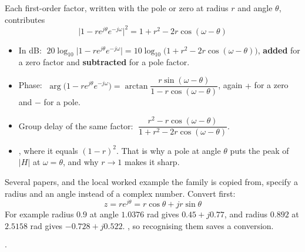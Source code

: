 Each first-order factor, written with the pole or zero at radius $r$ and angle $\theta$,
contributes
\[ \big|1-re^{j\theta}e^{-j\omega}\big|^{2}=1+r^{2}-2r\cos(\omega-\theta) \]
\begin{itemize}
  \item In dB: $\;20\log_{10}\big|1-re^{j\theta}e^{-j\omega}\big|
        =10\log_{10}\!\big(1+r^{2}-2r\cos(\omega-\theta)\big)$,
        \textbf{added} for a zero factor and \textbf{subtracted} for a pole factor.
  \item Phase: $\;\arg\big(1-re^{j\theta}e^{-j\omega}\big)
        =\arctan\dfrac{r\sin(\omega-\theta)}{1-r\cos(\omega-\theta)}$,
        again $+$ for a zero and $-$ for a pole.
  \item Group delay of the same factor:
        $\;\dfrac{r^{2}-r\cos(\omega-\theta)}{1+r^{2}-2r\cos(\omega-\theta)}$.
  \item {}, where it
        equals $(1-r)^2$. That is why a pole at angle $\theta$ puts the peak of $|H|$ at
        $\omega=\theta$, and why $r\to1$ makes it sharp.
\end{itemize}

{\color{sub}\footnotesize Several papers, and the local worked example the family is
copied from, specify a radius and an angle instead of a complex number. Convert first:}
\[ z=re^{j\theta}=r\cos\theta+jr\sin\theta \]
For example radius $0.9$ at angle $1.0376$ rad gives $0.45+j0.77$, and radius $0.892$ at
$2.5158$ rad gives $-0.728+j0.522$. , so
recognising them saves a conversion.

\hr


{\color{sub}\footnotesize {} 
\gap$\cdot$\gap {}}

